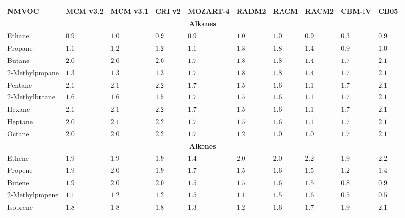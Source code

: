 {%
    \renewcommand{\arraystretch}{1.1}%
    \begin{sidewaystable}%
        \begin{center}%
            \begin{tabular}{llllllllll}%
                \hline \hline
                \textbf{NMVOC} & \textbf{MCM v3.2} & \textbf{MCM v3.1} & \textbf{CRI v2} & \textbf{MOZART-4} & \textbf{RADM2} & \textbf{RACM} & \textbf{RACM2} & \textbf{CBM-IV} & \textbf{CB05} \\ 
                \hline \hline \multicolumn{10}{c}{\textbf{Alkanes}}  \\ \hline
                Ethane & $0.9$ & $1.0$ & $0.9$ & $0.9$ & $1.0$ & $1.0$ & $0.9$ & $0.3$ & $0.9$ \\
                Propane & $1.1$ & $1.2$ & $1.2$ & $1.1$ & $1.8$ & $1.8$ & $1.4$ & $0.9$ & $1.0$ \\
                Butane & $2.0$ & $2.0$ & $2.0$ & $1.7$ & $1.8$ & $1.8$ & $1.4$ & $1.7$ & $2.1$ \\
                $2$-Methylpropane & $1.3$ & $1.3$ & $1.3$ & $1.7$ & $1.8$ & $1.8$ & $1.4$ & $1.7$ & $2.1$ \\
                Pentane & $2.1$ & $2.1$ & $2.2$ & $1.7$ & $1.5$ & $1.6$ & $1.1$ & $1.7$ & $2.1$ \\
                $2$-Methylbutane & $1.6$ & $1.6$ & $1.5$ & $1.7$ & $1.5$ & $1.6$ & $1.1$ & $1.7$ & $2.1$ \\
                Hexane & $2.1$ & $2.1$ & $2.2$ & $1.7$ & $1.5$ & $1.6$ & $1.1$ & $1.7$ & $2.1$ \\
                Heptane & $2.0$ & $2.1$ & $2.2$ & $1.7$ & $1.5$ & $1.6$ & $1.1$ & $1.7$ & $2.1$ \\
                Octane & $2.0$ & $2.0$ & $2.2$ & $1.7$ & $1.2$ & $1.0$ & $1.0$ & $1.7$ & $2.1$ \\ \hline
                \multicolumn{10}{c}{\textbf{Alkenes}} \\ \hline
                Ethene & $1.9$ & $1.9$ & $1.9$ & $1.4$ & $2.0$ & $2.0$ & $2.2$ & $1.9$ & $2.2$ \\
                Propene & $1.9$ & $2.0$ & $1.9$ & $1.7$ & $1.5$ & $1.6$ & $1.5$ & $1.2$ & $1.4$ \\
                Butene & $1.9$ & $2.0$ & $2.0$ & $1.5$ & $1.5$ & $1.6$ & $1.5$ & $0.8$ & $0.9$ \\
                $2$-Methylpropene & $1.1$ & $1.2$ & $1.2$ & $1.5$ & $1.1$ & $1.5$ & $1.6$ & $0.5$ & $0.5$ \\
                Isoprene & $1.8$ & $1.8$ & $1.8$ & $1.3$ & $1.2$ & $1.6$ & $1.7$ & $1.9$ & $2.1$ \\ \hline

\end{tabular}
\end{center}
\end{sidewaystable}}
